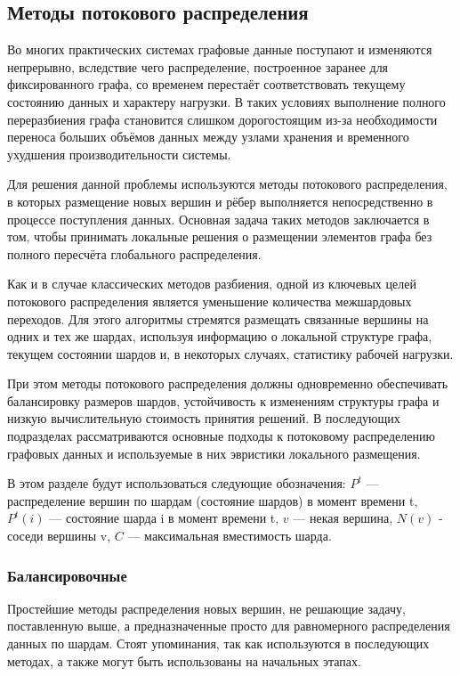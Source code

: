 \subsection{Методы потокового распределения}

Во многих практических системах графовые данные поступают и изменяются непрерывно, вследствие чего распределение, построенное заранее для фиксированного графа, со временем перестаёт соответствовать текущему состоянию данных и характеру нагрузки. В таких условиях выполнение полного переразбиения графа становится слишком дорогостоящим из-за необходимости переноса больших объёмов данных между узлами хранения и временного ухудшения производительности системы.

Для решения данной проблемы используются методы потокового распределения, в которых размещение новых вершин и рёбер выполняется непосредственно в процессе поступления данных. Основная задача таких методов заключается в том, чтобы принимать локальные решения о размещении элементов графа без полного пересчёта глобального распределения.

Как и в случае классических методов разбиения, одной из ключевых целей потокового распределения является уменьшение количества межшардовых переходов. Для этого алгоритмы стремятся размещать связанные вершины на одних и тех же шардах, используя информацию о локальной структуре графа, текущем состоянии шардов и, в некоторых случаях, статистику рабочей нагрузки.

При этом методы потокового распределения должны одновременно обеспечивать балансировку размеров шардов, устойчивость к изменениям структуры графа и низкую вычислительную стоимость принятия решений. В последующих подразделах рассматриваются основные подходы к потоковому распределению графовых данных и используемые в них эвристики локального размещения.

В этом разделе будут использоваться следующие обозначения:  $P^t$ --- распределение вершин по шардам (состояние шардов) в момент времени t, $P^t(i)$ --- состояние шарда i в момент времени t, $v$ --- некая вершина, $N(v)$ - соседи вершины v, $C$ --- максимальная вместимость шарда.

\subsubsection{Балансировочные}

Простейшие методы распределения новых вершин, не решающие задачу, поставленную выше, а предназначенные просто для равномерного распределения данных по шардам. Стоят упоминания, так как используются в последующих методах, а также могут быть использованы на начальных этапах.

